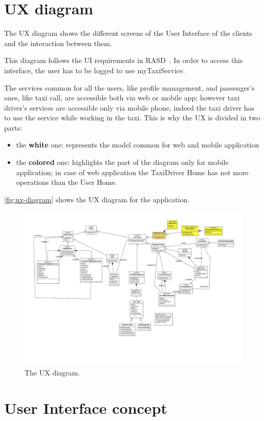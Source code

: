 \section{UX diagram}
The UX diagram shows the different screens of the User Interface of the clients and the interaction between them.

This diagram follows the UI requirements in RASD~\cite{rasd}.
In order to access this interface, the user has to be logged to use myTaxiService.

The services common for all the users, like profile management, and passenger's ones, like taxi call, are accessible both via web or mobile app; however taxi driver's services are accessible only via mobile phone, indeed the taxi driver has to use the service while working in the taxi.
This is why the UX is divided in two parts:
\begin{itemize}
\item the {\bf white} one: represents the model common for web and mobile application
\item the {\bf colored} one: highlights the part of the diagram only for mobile application; in case of web application the TaxiDriver Home has not more operations than the User Home.
\end{itemize}
\autoref{fig:ux-diagram} shows the UX diagram for the application.

\begin{figure}[h]
\centering
\includegraphics[width=\textwidth]{diagrams/UXdiagramSE2}
\caption{The UX diagram.}
\label{fig:ux-diagram}
\end{figure}

\FloatBarrier
\section{User Interface concept}

